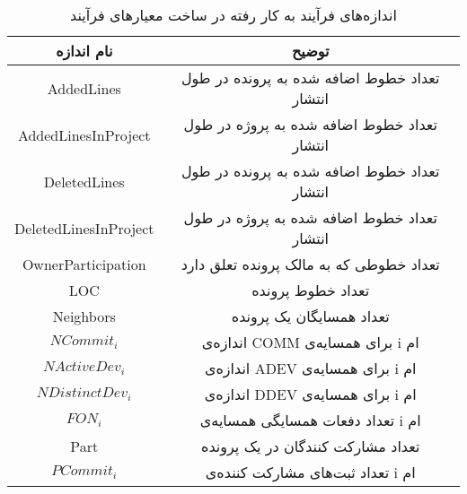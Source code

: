  \begin{table}[H] 
	\renewcommand*{\arraystretch}{1.5}	
	\centering \caption{اندازه‌های فرآیند به کار رفته در ساخت معیارهای فرآیند 
	}
	\label{tab:process-measures2}
	
	\begin{tabular}{|c|c|}
		
		\hline
		\hline
		نام اندازه  & توضیح
		\\
		
		\hline
		\hline
		AddedLines &
		تعداد خطوط اضافه شده به پرونده در طول انتشار
		\\
		\hline
		AddedLinesInProject & 
		تعداد خطوط اضافه شده به پروژه در طول انتشار
		\\ 
		\hline
			DeletedLines &
		تعداد خطوط اضافه شده به پرونده در طول انتشار
		\\
		\hline
		DeletedLinesInProject & 
		تعداد خطوط اضافه شده به پروژه در طول انتشار
		\\ 
		\hline
		OwnerParticipation & تعداد خطوطی که به مالک پرونده تعلق دارد
		\\
		\hline
		LOC & تعداد خطوط پرونده
		\\
		\hline
	Neighbors & تعداد همسایگان یک پرونده
	\\ \hline
	$NCommit_i$ &
	اندازه‌ی COMM  برای همسایه‌ی i ام
	\\ \hline
	$NActiveDev_i$ & 
اندازه‌ی ADEV برای همسایه‌ی i ام 
	\\ \hline
	$NDistinctDev_i$ &
	اندازه‌ی DDEV برای همسایه‌ی  i ام
	\\ \hline
	$FON_i$ & 
	تعداد دفعات همسایگی  همسایه‌ی i ام\\
	\hline
Part & 
تعداد مشارکت کنند‌گان در یک پرونده 
\\ \hline
	$PCommit_i$ &
	 تعداد ثبت‌‌‌های مشارکت کننده‌ی i ام
	 \\ \hline
	
	
	
		
	\end{tabular}
\end{table}

